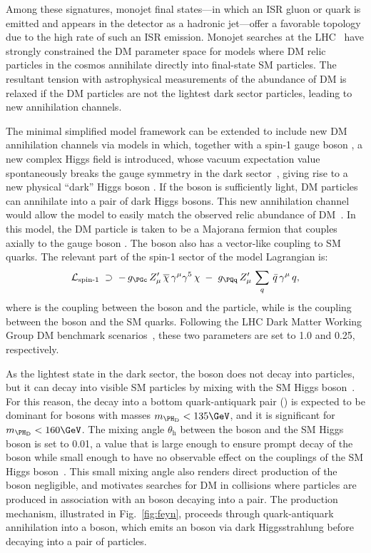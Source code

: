 Among these signatures, monojet final states---in which an ISR gluon or quark is emitted and appears in the detector as a hadronic jet---offer a favorable topology due to the high rate of such an ISR emission. Monojet searches at the LHC~\cite{CMS:2021far,PhysRevD.103.112006} have strongly constrained the DM parameter space for models where DM relic particles in the cosmos annihilate directly into final-state SM particles. The resultant tension with astrophysical measurements of the abundance of DM is relaxed if the DM particles are not the lightest dark sector particles, leading to new annihilation channels. 

The minimal simplified model framework can be extended to include new DM annihilation channels via models in which, together with a spin-1 gauge boson \PZpr, a new complex Higgs field is introduced, whose vacuum expectation value spontaneously breaks the gauge symmetry in the dark sector~\cite{Duerr:2017uap}, giving rise to a new physical ``dark'' Higgs boson \darkHiggs. If the \darkHiggs boson is sufficiently light, DM particles can annihilate into a pair of dark Higgs bosons. This new annihilation channel would allow the model to easily match the observed relic abundance of DM~\cite{Bell:2016fqf,Kahlhoefer:2015bea,Bell:2016uhg}. In this model, the DM particle \PGc is taken to be a Majorana fermion that couples axially to the gauge boson \PZpr. The \PZpr boson also has a vector-like coupling to SM quarks. The relevant part of the spin-1 sector of the model Lagrangian is:
\begin{equation*}
  \mathcal{L}_{\text{spin-1}} \;\supset\; -\,\gchi\,Z^\prime_\mu\,\overline{\chi}\,\gamma^\mu\gamma^5\,\chi \;-\; \gq\,Z^\prime_\mu\,\sum_{q}\,\bar{q}\,\gamma^\mu\,q,
\end{equation*}
where \gchi is the coupling between the \PZpr boson and the \PGc particle, while \gq is the coupling between the \PZpr boson and the SM quarks. Following the LHC Dark Matter Working Group DM benchmark scenarios~\cite{Albert:2017onk}, these two parameters are set to 1.0 and 0.25, respectively.

As the lightest state in the dark sector, the \darkHiggs boson does not decay into \PGc particles, but it can decay into visible SM particles by mixing with the SM Higgs boson~\cite{Frandsen:2012rk,Kahlhoefer:2015bea}. For this reason, the decay into a bottom quark-antiquark pair (\bbbar) is expected to be dominant for \darkHiggs bosons with masses $m_{\darkHiggs} < 135\GeV$, and it is significant for $m_{\darkHiggs} < 160\GeV$. The mixing angle $\theta_{\mathrm{h}}$ between the \darkHiggs boson and the SM Higgs boson is set to 0.01, a value that is large enough to ensure prompt decay of the \darkHiggs boson while small enough to have no observable effect on the couplings of the SM Higgs boson~\cite{CMS:2022dwd}. This small mixing angle also renders direct production of the \darkHiggs boson negligible, and motivates searches for DM in collisions where \PGc particles are produced in association with an \darkHiggs boson decaying into a \bbbar pair. The production mechanism, illustrated in Fig.~\ref{fig:feyn}, proceeds through quark-antiquark annihilation into a \PZpr boson, which emits an \darkHiggs boson via dark Higgsstrahlung before decaying into a pair of \PGc particles.


